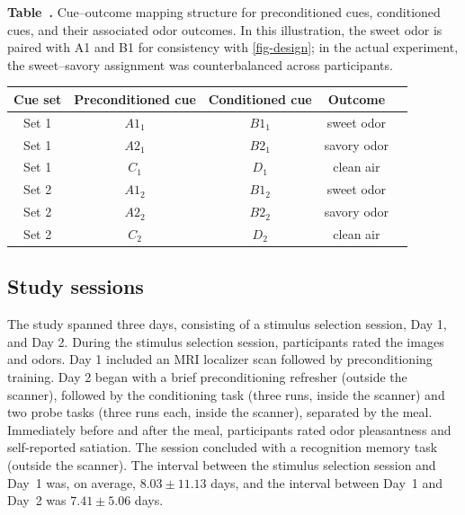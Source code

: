 \documentclass[12pt,letterpaper]{article}
\begin{document}
\par\bigskip\begingroup
{}


\par\noindent\textbf{Table~\thetable. }Cue–outcome mapping structure for preconditioned cues, conditioned cues, and their associated odor outcomes. 
In this illustration, the sweet odor is paired with A1 and B1 for consistency with \autoref{fig-design}; 
in the actual experiment, the sweet–savory assignment was counterbalanced across participants.
\par

\label{tab:cue-mapping}
\small\setlength{\tabcolsep}{4pt}\begin{tabular}{ccccc}
\hline
\textbf{Cue set} & \textbf{Preconditioned cue} & \textbf{Conditioned cue} & \textbf{Outcome} \\
\hline
Set 1 & $A1_{1}$ & $B1_{1}$ & sweet odor \\
Set 1 & $A2_{1}$ & $B2_{1}$ & savory odor \\
Set 1 & $C_{1}$ & $D_{1}$ & clean air \\
Set 2 & $A1_{2}$ & $B1_{2}$ & sweet odor \\
Set 2 & $A2_{2}$ & $B2_{2}$ & savory odor \\
Set 2 & $C_{2}$ & $D_{2}$ & clean air \\
\hline
\end{tabular}

\par\endgroup\bigskip





\subsection*{Study sessions}

The study spanned three days, consisting of a stimulus selection session, Day 1, and Day 2. During the stimulus selection session, participants rated the images and odors. Day 1 included an MRI localizer scan followed by preconditioning training. Day 2 began with a brief preconditioning refresher (outside the scanner), followed by the conditioning task (three runs, inside the scanner) and two probe tasks (three runs each, inside the scanner), separated by the meal. Immediately before and after the meal, participants rated odor pleasantness and self-reported satiation. The session concluded with a recognition memory task (outside the scanner). The interval between the stimulus selection session and Day~1 was, on average, \(8.03 \pm 11.13\) days, and the interval between Day~1 and Day~2 was \(7.41 \pm 5.06\) days.
\end{document}
